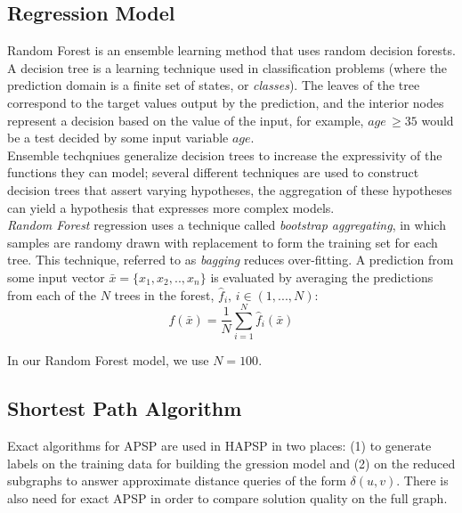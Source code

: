 \documentclass[10.5pt,journal]{IEEEtran}
\begin{document}
\subsection{Regression Model}
	Random Forest is an ensemble learning method that uses random decision forests\cite{randForest}. 
	A decision tree
	is a learning technique used in classification problems (where the prediction domain is a finite
	set of states, or {\it{classes}}). The leaves of the tree correspond to the target values output
	by the prediction, and the interior nodes represent a decision based on the value of the input,
	for example, $age\,\ge 35$ would be a test decided by some input variable $age$. \\
	
	Ensemble
	techqniues generalize decision trees to increase the expressivity of the functions they can
	model; several different techniques are used to construct decision trees that assert
	varying hypotheses, the aggregation of these hypotheses can yield a hypothesis that expresses
	more complex models. \\
	
	{\it{Random Forest}} regression uses a technique called {\it{bootstrap aggregating}}, in
	which samples are randomy drawn with replacement to form the training set for each tree.
	This technique, referred to as {\it{bagging}} reduces over-fitting. A prediction from
	some input vector $\bar{x} = \{x_1,x_2,..,x_n\}$ is evaluated by averaging the
	predictions from each of the $N$ trees in the forest, $\hat{f}_i,\,i\in (1,...,N)$:
		\[f(\bar{x}) = \frac{1}{N} \sum_{i=1}^N\hat{f}_i(\bar{x})\]
	
	In our Random Forest model, we use $N=100$. 

\subsection{Shortest Path Algorithm}
	Exact algorithms for APSP are used in HAPSP in two places: (1) to generate labels on the training
	data for building the gression model and (2) on the reduced subgraphs to answer approximate
	distance queries of the form $\delta(u,v)$. There is also need for exact APSP in order to
	compare solution quality on the full graph. \\
	
\end{document}
